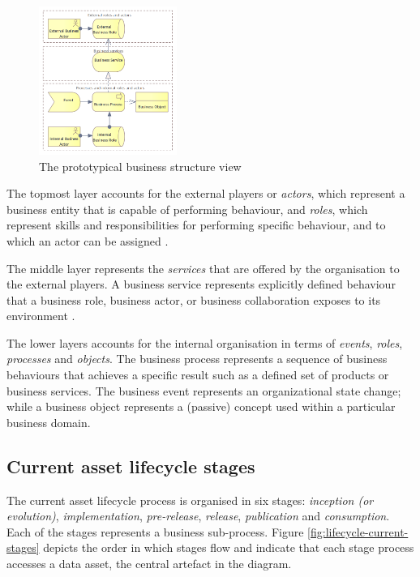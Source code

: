 	\begin{figure}[h]
		\centering
		\includegraphics[width=0.4\textwidth]{images/views/Business view.png}
		\caption{The prototypical business structure view}
		\label{fig:business-structure-protopypical}
	\end{figure} 
	
	The topmost layer accounts for the external players or \textit{actors}, which represent a business entity that is capable of performing behaviour, and \textit{roles}, which represent skills and responsibilities for performing specific behaviour, and to which an actor can be assigned \citep{archimate3.1}. 
	
	The middle layer represents the \textit{services} that are offered by the organisation to the external players. A business service represents explicitly defined behaviour that a business role, business actor, or business collaboration exposes to its environment \citep{archimate3.1}.
	

	
	The lower layers accounts for the internal organisation in terms of \textit{events}, \textit{roles}, \textit{processes} and \textit{objects}. The business process represents a sequence of business behaviours that achieves a specific result such as a defined set of products or business services. The business event represents an organizational state change; while a business object represents a (passive) concept used within a particular business domain.
	

	\subsection{Current asset lifecycle stages}
	\label{sec:lifecycle-current-stages}
	
	The current asset lifecycle process is organised in six stages: \textit{inception (or evolution)}, \textit{implementation}, \textit{pre-release}, \textit{release}, \textit{publication} and \textit{consumption}. Each of the stages represents a business sub-process. Figure \ref{fig:lifecycle-current-stages} depicts the order in which stages flow and indicate that each stage process accesses a data asset, the central artefact in the diagram.
	

